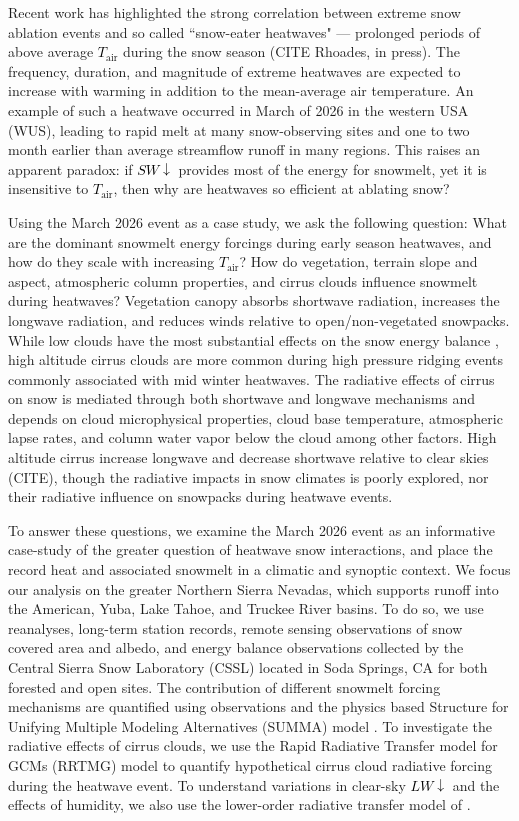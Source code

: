 \documentclass[12pt]{iopjournal}
\newcommand{\tair}{\textcolor{black}{$T_{\mathrm{air}}$}\xspace}
\newcommand{\lwdn}{\textcolor{black}{$LW\downarrow$}\xspace}
\newcommand{\swdn}{\textcolor{black}{$SW\downarrow$}\xspace}
\begin{document}
Recent work has highlighted the strong correlation between extreme snow ablation events and so called ``snow-eater heatwaves" --- prolonged periods of above average \tair during the snow season (CITE Rhoades, in press).
The frequency, duration, and magnitude of extreme heatwaves are expected to increase with warming in addition to the mean-average air temperature. 
An example of such a heatwave occurred in March of 2026 in the western USA (WUS), leading to rapid melt at many snow-observing sites and one to two month earlier than average streamflow runoff in many regions.
This raises an apparent paradox: if \swdn provides most of the energy for snowmelt, yet it is insensitive to \tair, then why are heatwaves so efficient at ablating snow?

Using the March 2026 event as a case study, we ask the following question:
What are the dominant snowmelt energy forcings during early season heatwaves, and how do they scale with increasing \tair?
How do vegetation, terrain slope and aspect, atmospheric column properties, and cirrus clouds influence snowmelt during heatwaves? 
Vegetation canopy absorbs shortwave radiation, increases the longwave radiation, and reduces winds relative to open/non-vegetated snowpacks. 
While low clouds have the most substantial effects on the snow energy balance \citep{Rudisill2025-cx}, high altitude cirrus clouds are more common during high pressure ridging events commonly associated with mid winter heatwaves. 
The radiative effects of cirrus on snow is mediated through both shortwave and longwave mechanisms and depends on cloud microphysical properties, cloud base temperature, atmospheric lapse rates, and column water vapor below the cloud among other factors. 
High altitude cirrus increase longwave and decrease shortwave relative to clear skies (CITE), though the radiative impacts in snow climates is poorly explored, nor their radiative influence on snowpacks during heatwave events. 

To answer these questions, we examine the March 2026 event as an informative case-study of the greater question of heatwave snow interactions, and place the record heat and associated snowmelt in a climatic and synoptic context.
We focus our analysis on the greater Northern Sierra Nevadas, which supports runoff into the American, Yuba, Lake Tahoe, and Truckee River basins. 
To do so, we use reanalyses, long-term station records, remote sensing observations of snow covered area and albedo, and energy balance observations collected by the Central Sierra Snow Laboratory (CSSL) located in Soda Springs, CA for both forested and open sites.
The contribution of different snowmelt forcing mechanisms are quantified using observations and the physics based Structure for Unifying Multiple Modeling Alternatives (SUMMA) model \citep{Clark2015-ni}.
To investigate the radiative effects of cirrus clouds, we use the Rapid Radiative Transfer model for GCMs (RRTMG) model to quantify hypothetical cirrus cloud radiative forcing during the heatwave event. 
To understand variations in clear-sky \lwdn and the effects of humidity, we also use the lower-order radiative transfer model of \cite{Brutsaert1975-jl}.
\end{document}
